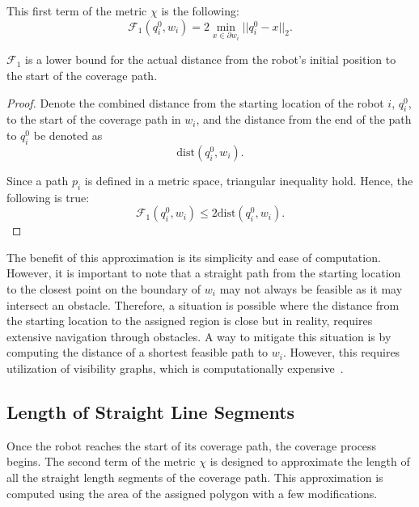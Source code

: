 \documentclass[../main.tex]{subfiles}
\begin{document}
This first term of the metric $\chi$ is the following: 
\begin{equation}
	\mathcal{F}_1(q^0_i,w_i)=2\min_{x\in\partial w_i}||q^0_i-x||_2.
\end{equation}

\begin{proposition}
	$\mathcal{F}_1$ is a lower bound for the actual distance from the robot's initial position to the start of the coverage path.
\end{proposition}
\begin{proof}
	Denote the combined distance from the starting location of the robot $i$, $q^0_i$, to the start of the coverage path in $w_i$, and the distance from the end of the path to $q^0_i$ be denoted as
	\begin{equation}
		\text{dist}(q^0_i,w_i).
	\end{equation}

	Since a path $p_i$ is defined in a metric space, triangular inequality hold. Hence, the following is true:
	\begin{equation}
		\mathcal{F}_1(q^0_i,w_i)\leq2\text{dist}(q^0_i,w_i).
	\end{equation}
\end{proof}

\begin{remark}
The benefit of this approximation is its simplicity and ease of computation. However, it is important to note that a straight path from the starting location to the closest point on the boundary of $w_i$ may not always be feasible as it may intersect an obstacle. Therefore, a situation is possible where the distance from the starting location to the assigned region is close but in reality, requires extensive navigation through obstacles. A way to mitigate this situation is by computing the distance of a shortest feasible path to $w_i$. However, this requires utilization of visibility graphs, which is computationally expensive~\cite{planning-kinematics}.
\end{remark}


\subsection{Length of Straight Line Segments}
\label{subsection:sum_straight_segments}

Once the robot reaches the start of its coverage path, the coverage process begins. The second term of the metric $\chi$ is designed to approximate the length of all the straight length segments of the coverage path. This approximation is computed using the area of the assigned polygon with a few modifications.
\end{document}
